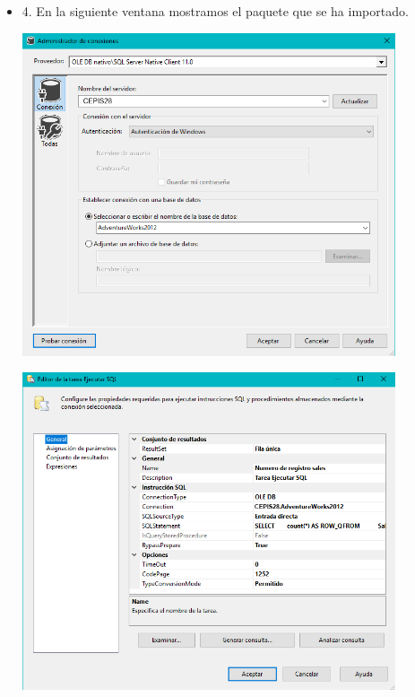 \begin{itemize}
\item 4. En la siguiente ventana mostramos el paquete que se ha importado.\\
	\begin{center}
	\includegraphics[width=11cm]{./Imagenes/img19}
	\end{center}	
	\begin{center}
	\includegraphics[width=11cm]{./Imagenes/img20}
	\end{center}	
	\begin{center}


\end{center}
\end{itemize}

